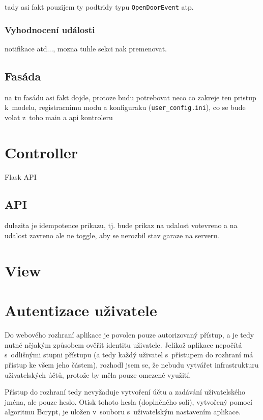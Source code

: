 tady asi fakt pouzijem ty podtridy typu \texttt{OpenDoorEvent} atp.

\subsubsection{Vyhodnocení události}

notifikace atd..., mozna tuhle sekci nak premenovat.

\subsection{Fasáda}

na tu fasádu asi fakt dojde, protoze budu potrebovat neco co zakreje ten pristup k~modelu, registracnimu modu a konfiguraku (\texttt{user\_config.ini}), co se bude volat z~toho main a api kontroleru

\section{Controller}

Flask API

\subsection{API}

dulezita je idempotence prikazu, tj. bude prikaz na udalost votevreno a na udalost zavreno ale ne toggle, aby se nerozbil stav garaze na serveru.

\section{View}

\section{Autentizace uživatele}
\label{sec:de_auth}

Do webového rozhraní aplikace je povolen pouze autorizovaný přístup, a je tedy nutné nějakým způsobem ověřit identitu uživatele. Jelikož aplikace nepočítá s~odlišnými stupni přístupu (a tedy každý uživatel s~přístupem do rozhraní má přístup ke všem jeho částem), rozhodl jsem se, že nebudu vytvářet infrastrukturu uživatelských účtů, protože by měla pouze omezené využití.

Přístup do rozhraní tedy nevyžaduje vytvoření účtu a zadávání uživatelského jména, ale pouze heslo. Otisk tohoto hesla (doplněného solí), vytvořený pomocí algoritmu Bcrypt, je uložen v~souboru s~uživatelským nastavením aplikace.

